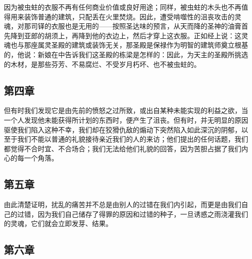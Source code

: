 因为被虫蛀的衣服不再有任何商业价值或良好用途；同样，被虫蛀的木头也不再值得用来装饰普通的建筑，只配丢在火里焚烧。因此，遭受啃噬性的沮丧攻击的灵魂，对那司铎的衣服也是无用的——按照圣达味的预言，从天而降的圣神的油膏首先降到亚郎的胡须上，再降到他的衣边上，然后才穿上这衣服。正如经上说：这灵魂也与那座属灵圣殿的建筑或装饰无关，那圣殿是保禄作为明智的建筑师奠立根基的，他说：新娘在中告诉我们这圣殿的栋梁是怎样的：因此，为天主的圣殿所挑选的木材，是那些芬芳、不易腐烂、不受岁月朽坏、也不被虫蛀的。\par


\subsection{第四章}

\par

但有时我们发现它是由先前的愤怒之过所致，或出自某种未能实现的利益之欲，当一个人发现他未能获得所计划的东西时，便产生了沮丧。但有时，并无明显的原因驱使我们陷入这种不幸，我们却在狡猾仇敌的煽动下突然陷入如此深沉的阴郁，以至于我们不能以普通的礼貌接待亲近我们的人的来访；他们提出的任何话题，我们都觉得不合时宜、不合场合；我们无法给他们礼貌的回答，因为苦胆占据了我们内心的每一个角落。\par


\subsection{第五章}

\par

由此清楚证明，扰乱的痛苦并不总是由别人的过错在我们内引起，而更是由我们自己的过错，因为我们自己储存了得罪的原因和过错的种子，一旦诱惑之雨浇灌我们的灵魂，它们就会立即发芽、结果。\par


\subsection{第六章}

